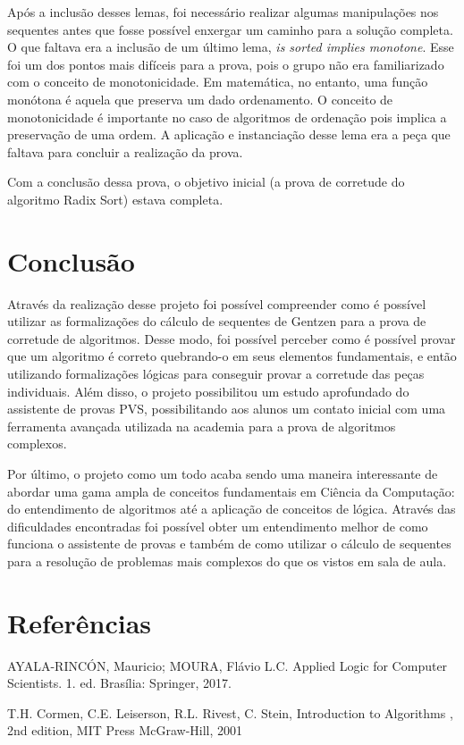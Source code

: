 \documentclass[12pt]{article}
\begin{document}
Após a inclusão desses lemas, foi necessário realizar algumas manipulações nos sequentes antes que fosse possível enxergar um caminho para a solução completa. O que faltava era a inclusão de um último lema, \textit{is sorted implies monotone}. Esse foi um dos pontos mais difíceis para a prova, pois o grupo não era familiarizado com o conceito de monotonicidade. Em matemática, no entanto, uma função monótona é aquela que preserva um dado ordenamento. O conceito de monotonicidade é importante no caso de algoritmos de ordenação pois implica a preservação de uma ordem. A aplicação e instanciação desse lema era a peça que faltava para concluir a realização da prova.

Com a conclusão dessa prova, o objetivo inicial (a prova de corretude do algoritmo Radix Sort) estava completa.

\section{Conclusão}
Através da realização desse projeto foi possível compreender como é possível utilizar as formalizações do cálculo de sequentes de Gentzen para a prova de corretude de algoritmos. Desse modo, foi possível perceber como é possível provar que um algoritmo é correto quebrando-o em seus elementos fundamentais, e então utilizando formalizações lógicas para conseguir provar a corretude das peças individuais. Além disso, o projeto possibilitou um estudo aprofundado do assistente de provas PVS, possibilitando aos alunos um contato inicial com uma ferramenta avançada utilizada na academia para a prova de algoritmos complexos.

Por último, o projeto como um todo acaba sendo uma maneira interessante de abordar uma gama ampla de conceitos fundamentais em Ciência da Computação: do entendimento de algoritmos até a aplicação de conceitos de lógica. Através das dificuldades encontradas foi possível obter um entendimento melhor de como funciona o assistente de provas e também de como utilizar o cálculo de sequentes para a resolução de problemas mais complexos do que os vistos em sala de aula.

\section{Referências}
AYALA-RINCÓN, Mauricio; MOURA, Flávio L.C. Applied Logic for Computer Scientists. 1. ed. Brasília: Springer, 2017.

T.H. Cormen, C.E. Leiserson, R.L. Rivest, C. Stein, Introduction to Algorithms , 2nd edition, MIT Press McGraw-Hill, 2001
\end{document}
